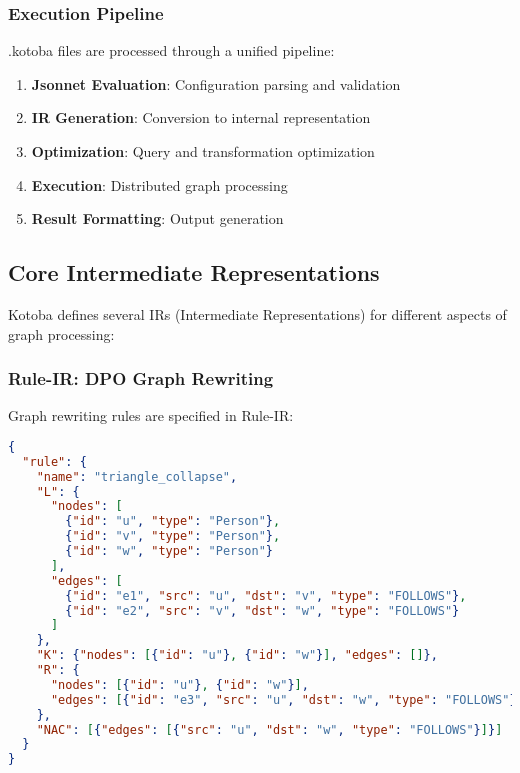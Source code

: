 \documentclass[11pt,a4paper]{article}
\begin{document}
\subsubsection{Execution Pipeline}
\label{subsubsec:execution_pipeline}

.kotoba files are processed through a unified pipeline:

\begin{enumerate}
\item \textbf{Jsonnet Evaluation}: Configuration parsing and validation
\item \textbf{IR Generation}: Conversion to internal representation
\item \textbf{Optimization}: Query and transformation optimization
\item \textbf{Execution}: Distributed graph processing
\item \textbf{Result Formatting}: Output generation
\end{enumerate}

\subsection{Core Intermediate Representations}
\label{subsec:ir_design}

Kotoba defines several IRs (Intermediate Representations) for different aspects of graph processing:

\subsubsection{Rule-IR: DPO Graph Rewriting}
\label{subsubsec:rule_ir}

Graph rewriting rules are specified in Rule-IR:

\begin{lstlisting}[language=json,caption=DPO Rule-IR example]
{
  "rule": {
    "name": "triangle_collapse",
    "L": {
      "nodes": [
        {"id": "u", "type": "Person"},
        {"id": "v", "type": "Person"},
        {"id": "w", "type": "Person"}
      ],
      "edges": [
        {"id": "e1", "src": "u", "dst": "v", "type": "FOLLOWS"},
        {"id": "e2", "src": "v", "dst": "w", "type": "FOLLOWS"}
      ]
    },
    "K": {"nodes": [{"id": "u"}, {"id": "w"}], "edges": []},
    "R": {
      "nodes": [{"id": "u"}, {"id": "w"}],
      "edges": [{"id": "e3", "src": "u", "dst": "w", "type": "FOLLOWS"}]
    },
    "NAC": [{"edges": [{"src": "u", "dst": "w", "type": "FOLLOWS"}]}]
  }
}
\end{lstlisting}
\end{document}
